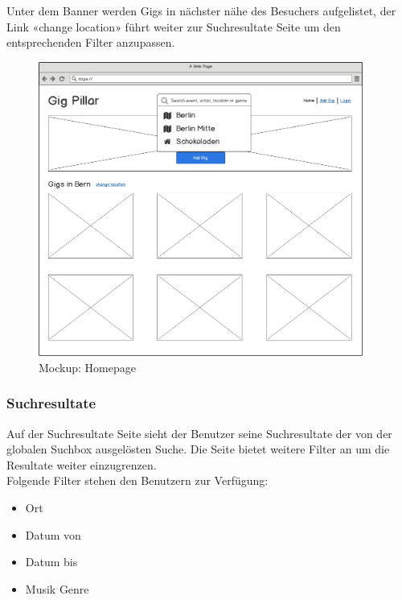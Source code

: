 Unter dem Banner werden Gigs in nächster nähe des Besuchers aufgelistet, der
Link «change location» führt weiter zur Suchresultate Seite um den
entsprechenden Filter anzupassen.

\begin{figure}[!htb]
  \centering
  \includegraphics[width=0.95\textwidth]{mockups/homepage.png}
  \caption{Mockup: Homepage}
\end{figure}

\clearpage
\subsubsection{Suchresultate}

Auf der Suchresultate Seite sieht der Benutzer seine Suchresultate der von der
globalen Suchbox ausgelösten Suche. Die Seite bietet weitere Filter an um die
Resultate weiter einzugrenzen.\\

\noindent
Folgende Filter stehen den Benutzern zur Verfügung:


\begin{itemize}
  \tightlist{}
  \item{} Ort
  \item{} Datum von
  \item{} Datum bis
  \item{} Musik Genre
\end{itemize}

